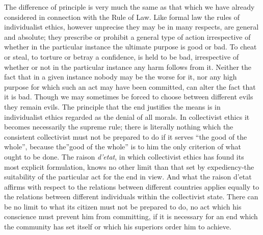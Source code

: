 \documentclass[11pt,openany]{book}
\begin{document}
The difference of principle is very much the same as that which we have already considered in connection with the Rule of Law. Like formal law the rules of individualist ethics, however unprecise they may be in many respects, are general and absolute; they prescribe or prohibit a general type of action irrespective of whether in the particular instance the ultimate purpose is good or bad. To cheat or steal, to torture or betray a confidence, is held to be bad, irrespective of whether or not in the particular instance any harm follows from it. Neither the fact that in a given instance nobody may be the worse for it, nor any high purpose for which such an act may have been committed, can alter the fact that it is bad. Though we may sometimes be forced to choose between different evils they remain evils. The principle that the end justifies the means is in individualist ethics regarded as the denial of all morals. In collectivist ethics it becomes necessarily the supreme rule; there is literally nothing which the consistent collectivist must not be prepared to do if it serves ``the good of the whole'', because the''good of the whole'' is to him the only criterion of what ought to be done. The raison \emph{d'etat}, in which collectivist ethics has found its most explicit formulation, knows no other limit than that set by expediency-the suitability of the particular act for the end in view. And what the raison d'etat affirms with respect to the relations between different countries applies equally to the relations between different individuals within the collectivist state. There can be no limit to what its citizen must not be prepared to do, no act which his conscience must prevent him from committing, if it is necessary for an end which the community has set itself or which his superiors order him to achieve.

\begin{center}\textasteriskcentered\hspace{0.9em}\textasteriskcentered\hspace{0.9em}\textasteriskcentered\end{center}

\begin{center}\textasteriskcentered\hspace{0.9em}\textasteriskcentered\hspace{0.9em}\textasteriskcentered\end{center}

\begin{center}\textasteriskcentered\hspace{0.9em}\textasteriskcentered\hspace{0.9em}\textasteriskcentered\end{center}
\end{document}
